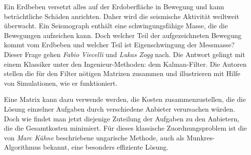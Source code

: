 Ein Erdbeben versetzt alles auf der Erdoberfläche in Bewegung und
kann beträchtliche Schäden anrichten.
Daher wird die seismische Aktivität weiltweit überwacht.
Ein Seismograph enthält eine schwingungsfähige Masse, die die Bewegungen
aufzeichen kann.
Doch welcher Teil der aufgezeichneten Bewegung kommt vom Erdbeben
und welcher Teil ist Eigenschwingung der Messmasse?
Dieser Frage gehen {\em Fabio Viecelli} und {\em Lukas Zogg} nach.
%
%
Die Antwort gelingt mit einem Klassiker unter den Ingenieur-Methoden:
dem Kalman-Filter.
Die Autoren stellen die für den Filter nötigen Matrizen zusammen
und illustrieren mit Hilfe von Simulationen, wie er funktioniert.

Eine Matrix kann dazu verwende werden, die Kosten zusammenzustellen,
die die Lösung einzelner Aufgaben durch verschiedene Anbieter
verursachen würden.
Doch wie findet man jetzt diejenige Zuteilung der Aufgaben
zu den Anbietern, die die Gesamtkosten minimiert.
Für dieses klassische Zuordnungsproblem ist die
von {\em Marc Kühne} beschriebene ungarische Methode,
%
auch als Munkres-Algorithmus bekannt, eine besonders effiziente
Lösung.



